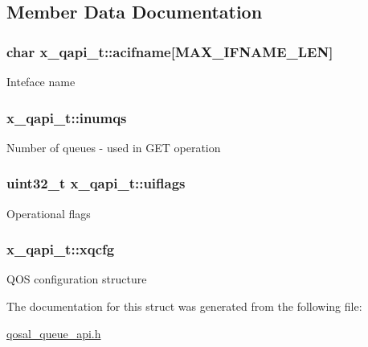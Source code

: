 \subsection{Member Data Documentation}
\hypertarget{structx__qapi__t_a6671bab69f3b9d974fa7a1d84c8f5cde}{
\subsubsection[{acifname}]{\setlength{\rightskip}{0pt plus 5cm}char x\-\_\-qapi\-\_\-t\-::acifname\mbox{[}M\-A\-X\-\_\-\-I\-F\-N\-A\-M\-E\-\_\-\-L\-E\-N\mbox{]}}}\label{structx__qapi__t_a6671bab69f3b9d974fa7a1d84c8f5cde}
Inteface name \hypertarget{structx__qapi__t_a88492f20f6606c17c7ef7818171e9868}{
\subsubsection[{inumqs}]{ x\-\_\-qapi\-\_\-t\-::inumqs}}\label{structx__qapi__t_a88492f20f6606c17c7ef7818171e9868}
Number of queues -\/ used in G\-E\-T operation \hypertarget{structx__qapi__t_af3b4909398080b7c1dfdce351624f288}{
\subsubsection[{uiflags}]{\setlength{\rightskip}{0pt plus 5cm}uint32\-\_\-t x\-\_\-qapi\-\_\-t\-::uiflags}}\label{structx__qapi__t_af3b4909398080b7c1dfdce351624f288}
Operational flags \hypertarget{structx__qapi__t_acb65b0589bf3cdcf72cbc6e320ddf9c6}{
\subsubsection[{xqcfg}]{ x\-\_\-qapi\-\_\-t\-::xqcfg}}\label{structx__qapi__t_acb65b0589bf3cdcf72cbc6e320ddf9c6}
Q\-O\-S configuration structure 

The documentation for this struct was generated from the following file\-:\begin{DoxyCompactItemize}
\item 
\hyperlink{qosal__queue__api_8h}{qosal\-\_\-queue\-\_\-api.\-h}\end{DoxyCompactItemize}
